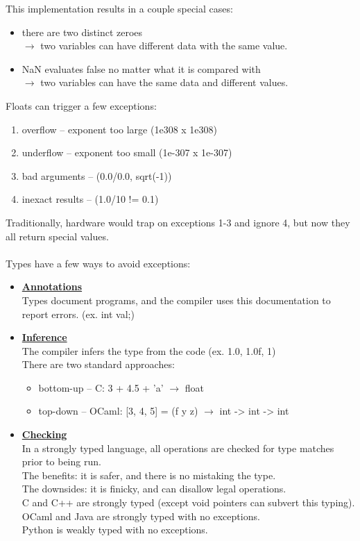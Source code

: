\documentclass[../../lecture_notes.tex]{subfiles}
\begin{document}
This implementation results in a couple special cases: \begin{itemize} [itemsep=0mm]
	\item there are two distinct zeroes\\
		$\rightarrow$  two variables can have different data with the same value.
	\item NaN evaluates false no matter what it is compared with\\
		$\rightarrow$ two variables can have the same data and different values.
\end{itemize}
Floats can trigger a few exceptions: \begin{enumerate} [itemsep=0mm]
	\item overflow -- exponent too large (1e308 x 1e308)
	\item underflow -- exponent too small (1e-307 x 1e-307)
	\item bad arguments -- (0.0/0.0, sqrt(-1))
	\item inexact results -- (1.0/10 != 0.1)
\end{enumerate}
Traditionally, hardware would trap on exceptions 1-3 and ignore 4, but now they all return special values.\\
\\
Types have a few ways to avoid exceptions: \begin{itemize} [itemsep=0mm]
	\item \textbf{\underline{Annotations}}\\
		Types document programs, and the compiler uses this documentation to report errors. (ex. int val;)\\
	\item \textbf{\underline{Inference}}\\
		The compiler infers the type from the code (ex. 1.0, 1.0f, 1)\\
		There are two standard approaches: \begin{itemize} [itemsep=0mm]
			\item bottom-up -- C: 3 + 4.5 + 'a' $\rightarrow$ float
			\item top-down -- OCaml: [3, 4, 5] = (f y z) $\rightarrow$ int -> int -> int
		\end{itemize}
	\item \textbf{\underline{Checking}}\\
		In a strongly typed language, all operations are checked for type matches prior to being run.\\
		The benefits: it is safer, and there is no mistaking the type.\\
		The downsides: it is finicky, and can disallow legal operations.\\
		C and C++ are strongly typed (except void pointers can subvert this typing).\\
		OCaml and Java are strongly typed with no exceptions.\\
		Python is weakly typed with no exceptions.
\end{itemize} 
\end{document}
